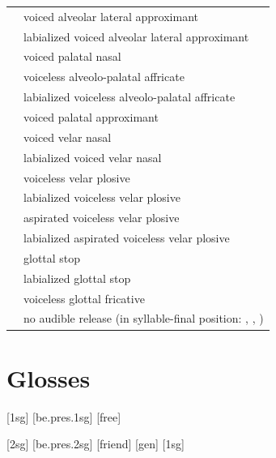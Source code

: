 \documentclass{article}
\begin{document}
\begin{xltabular}{\textwidth}{lL}
   & voiced alveolar lateral approximant \\
   & labialized voiced alveolar lateral approximant \\
   & voiced palatal nasal \\
   & voiceless alveolo-palatal affricate \\
   & labialized voiceless alveolo-palatal affricate \\
   & voiced palatal approximant \\
   & voiced velar nasal \\
   & labialized voiced velar nasal \\
   & voiceless velar plosive \\
   & labialized voiceless velar plosive \\
   & aspirated voiceless velar plosive \\
   & labialized aspirated voiceless velar plosive \\
   & glottal stop \\
   & labialized glottal stop \\
   & voiceless glottal fricative \\
  \ipa{\textcorner} & no audible release (in syllable-final position: , , ) \\
\end{xltabular}

\newpage\section{Glosses}

\ex[lingstyle=custom_nlevel]
\begingl
{}[{\sc 1sg}]
[be.{\sc pres.1sg}]
[free]
\endgl
\xe

\ex[lingstyle=custom_nlevel]
\begingl
{}[{\sc 2sg}]
[be.{\sc pres.2sg}]
[friend]
[{\sc gen}]
[{\sc 1sg}]
\endgl
\xe
\end{document}
